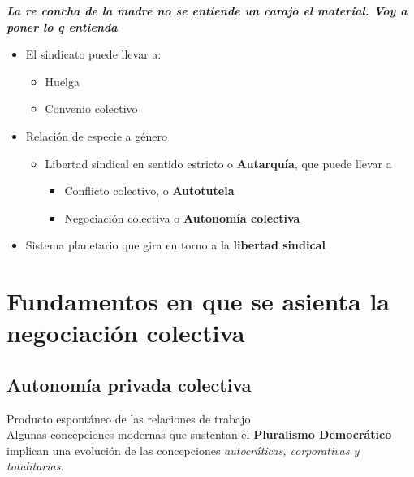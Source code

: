 \documentclass[spanish,12pt,a4paper,titlepage]{report}
\begin{document}
\begin{huge}
\emph{\textbf{La re concha de la madre no se entiende un carajo el material. Voy a poner lo q entienda}}
\end{huge}

\begin{itemize}
	\item El sindicato puede llevar a:
	\begin{itemize}
		\item Huelga
		\item Convenio colectivo
	\end{itemize}
	\item Relación de especie a género
	\begin{itemize}
		\item Libertad sindical en sentido estricto o \textbf{Autarquía}, que puede llevar a
		\begin{itemize}
			\item Conflicto colectivo, o \textbf{Autotutela}
			\item Negociación colectiva o \textbf{Autonomía colectiva}
		\end{itemize}
	\end{itemize}
	\item Sistema planetario que gira en torno a la \textbf{libertad sindical}
\end{itemize}

\section{Fundamentos en que se asienta la negociación colectiva}
\subsection{Autonomía privada colectiva}
Producto espontáneo de las relaciones de trabajo.\\

Algunas concepciones modernas que sustentan el \textbf{Pluralismo Democrático} implican una evolución de las concepciones \emph{autocráticas, corporativas y totalitarias}.\\
\end{document}
